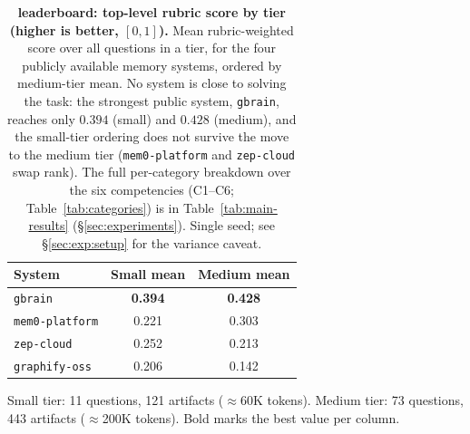 %
%
\begin{table}[t]
  \centering
  \caption{\textbf{\bench{} leaderboard: top-level rubric score by tier
    (higher is better, $[0,1]$).} Mean rubric-weighted score over all questions
    in a tier, for the four publicly available memory systems, ordered by
    medium-tier mean. No system is close to solving the task: the strongest
    public system, \texttt{gbrain}, reaches only $0.394$ (small) and $0.428$
    (medium), and the small-tier ordering does not survive the move to the
    medium tier (\texttt{mem0-platform} and \texttt{zep-cloud} swap rank). The
    full per-category breakdown over the six \bench{} competencies (C1--C6;
    Table~\ref{tab:categories}) is in Table~\ref{tab:main-results}
    (\S\ref{sec:experiments}). Single seed; see \S\ref{sec:exp:setup} for the
    variance caveat.}
  \label{tab:leaderboard}
  \small
  \begin{tabular}{l S[table-format=1.3] S[table-format=1.3]}
    \toprule
    {System} & {Small mean} & {Medium mean} \\
    \midrule
    \texttt{gbrain}        & \bfseries 0.394 & \bfseries 0.428 \\
    \texttt{mem0-platform} & 0.221 & 0.303 \\
    \texttt{zep-cloud}     & 0.252 & 0.213 \\
    \texttt{graphify-oss}  & 0.206 & 0.142 \\
    \bottomrule
  \end{tabular}
  \par\smallskip
  {\footnotesize Small tier: 11 questions, 121 artifacts ($\approx$60K tokens).
  Medium tier: 73 questions, 443 artifacts ($\approx$200K tokens). Bold marks
  the best value per column.}
\end{table}
